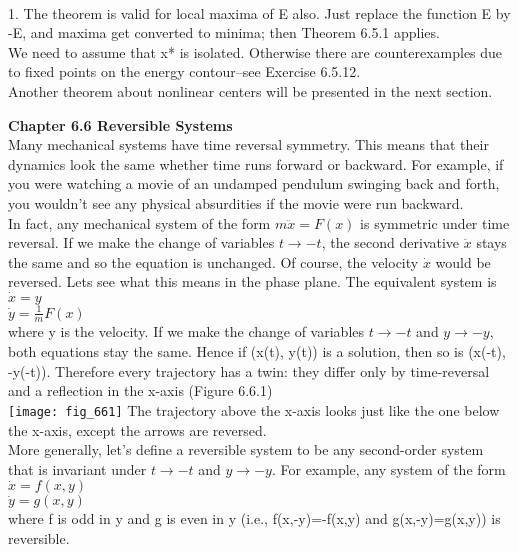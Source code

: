 \documentclass{article}
\newcommand\tab[1][1cm]{\hspace*{#1}}
\begin{document}
\\ \tab \tab 1. The theorem is valid for local maxima of E also. Just replace the function E by -E, and maxima get converted to minima; then Theorem 6.5.1 applies. 
\\ \tab \tab We need to assume that x* is isolated. Otherwise there are counterexamples due to fixed points on the energy contour--see Exercise 6.5.12. \\ Another theorem about nonlinear centers will be presented in the next section.

\textbf {Chapter 6.6 Reversible Systems} \\ \tab Many mechanical systems have time reversal symmetry. This means that their dynamics look the same whether time runs forward or backward. For example, if you were watching a movie of an undamped pendulum swinging back and forth, you wouldn't see any physical absurdities if the movie were run backward. \\ \tab
In fact, any mechanical system of the form $m\ddot{x}=F(x)$ is symmetric under time reversal. If we make the change of variables $t \to -t$, the second derivative $\ddot{x}$ stays the same and so the equation is unchanged. Of course, the velocity $\dot{x}$ would be reversed. Lets see what this means in the phase plane. The equivalent system is \\ \tab 
$\dot{x}=y$ \\ \tab
$\dot{y}=\frac{1}{m}F(x)$ \\
where y is the velocity. If we make the change of variables $t \to -t$ and $y \to -y$, both equations stay the same. Hence if (x(t), y(t)) is a solution, then so is (x(-t), -y(-t)). Therefore every trajectory has a twin: they differ only by time-reversal and a reflection in the x-axis (Figure 6.6.1) \\

\texttt{[image: fig\_661]}
The trajectory above the x-axis looks just like the one below the x-axis, except the arrows are reversed. \\ \tab More generally, let's define a reversible system to be any second-order system that is invariant under $t \to -t$ and $y \to -y$. For example, any system of the form \\ \tab
\tab $\dot{x}=f(x,y)$ \\ \tab \tab
$\dot{y}=g(x,y)$ \\ 
where f is odd in y and g is even in y (i.e., f(x,-y)=-f(x,y) and g(x,-y)=g(x,y)) is reversible. \\ \tab
\end{document}
